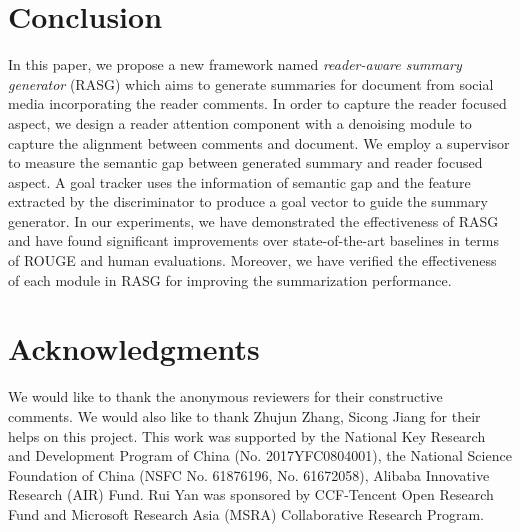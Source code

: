 \documentclass[letterpaper]{article} %
\begin{document}
\section{Conclusion}

In this paper, we propose a new framework named \emph{reader-aware summary generator} (RASG) which aims to generate summaries for document from social media incorporating the reader comments.
In order to capture the reader focused aspect, we design a reader attention component with a denoising module to capture the alignment between comments and document.
We employ a supervisor to measure the semantic gap between generated summary and reader focused aspect.
A goal tracker uses the information of semantic gap and the feature extracted by the discriminator to produce a goal vector to guide the summary generator.
In our experiments, we have demonstrated the effectiveness of RASG and have found significant improvements over state-of-the-art baselines in terms of ROUGE and human evaluations. 
Moreover, we have verified the effectiveness of each module in RASG for improving the summarization performance.

\section{Acknowledgments}
We would like to thank the anonymous reviewers for their constructive comments. 
We would also like to thank Zhujun Zhang, Sicong Jiang for their helps on this project. 
This work was supported by the National Key Research and Development Program of China (No. 2017YFC0804001), the National Science Foundation of China (NSFC No. 61876196, No. 61672058), Alibaba Innovative Research (AIR) Fund. 
Rui Yan was sponsored by CCF-Tencent Open Research Fund and Microsoft Research Asia (MSRA) Collaborative Research Program.



\end{document}
